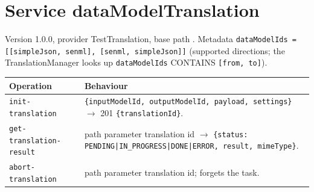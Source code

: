 \documentclass[a4paper]{arrowhead}
\begin{document}
\ArrowheadSetup
\section{Service dataModelTranslation}
Version 1.0.0, provider TestTranslation, base path . Metadata \texttt{dataModelIds = [[simpleJson, senml], [senml, simpleJson]]} (supported directions; the TranslationManager looks up \texttt{dataModelIds} CONTAINS \texttt{[from, to]}).
\begin{longtable}{p{}p{}}\toprule
Operation & Behaviour\\\midrule\endhead
\texttt{init-translation} & \texttt{\{inputModelId, outputModelId, payload, settings\}} $\rightarrow$ 201 \texttt{\{translationId\}}.\\
\texttt{get-translation-result} & path parameter translation id $\rightarrow$ \texttt{\{status: PENDING|IN\_PROGRESS|DONE|ERROR, result, mimeType\}}.\\
\texttt{abort-translation} & path parameter translation id; forgets the task.\\
\bottomrule\end{longtable}
\end{document}
